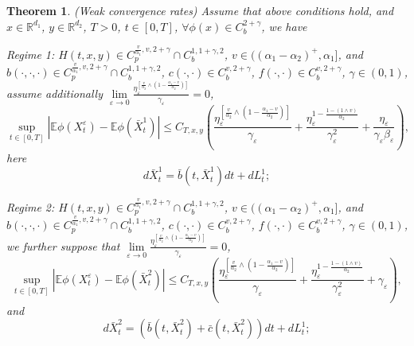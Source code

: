 \documentclass[11pt,reqno]{amsart}
\newtheorem{theorem}{\indent Theorem}[section]
\numberwithin{equation}{section}
\begin{document}
\begin{theorem}\label{WCRD}(Weak convergence rates)
	Assume that above conditions hold, and   $x\in \mathbb{R}^{d_{1}}$, $y\in \mathbb{R}^{d_{2}}$,   $T>0$, $t\in[0,T]$,   $\forall \phi(x)\in C^{2+\gamma}_{b}$, 
	we have
	
	Regime 1:  $H(t,x,y)\in C_{p}^{\frac{v}{\alpha_{1}},v,2+\gamma}\cap C_{b}^{1,1+\gamma,2}$, $v\in((\alpha_{1}-\alpha_{2})^{+},\alpha_{1}]$, and  $b(\cdot,\cdot,\cdot)\in C_{p}^{\frac{v}{\alpha_{1}},v,2+\gamma}\cap C_{b}^{1,1+\gamma,2}$, $c(\cdot,\cdot)\in C_{b}^{v,2+\gamma}$, $f(\cdot,\cdot)\in C_{b}^{v,2+\gamma}$,   $\gamma\in (0,1)$,  assume additionally $ \lim\limits_{\varepsilon \rightarrow0}\frac{ \eta_{\varepsilon}^{\left[ \frac{v}{\alpha_{2}}\wedge \left( 1-\frac{\alpha_{1}-v}{\alpha_{2}} \right)\right]  }}{\gamma_{\varepsilon}}=0$, 
	\begin{equation}\nonumber
		\sup_{t\in [0,T]}|\mathbb{E}\phi(X_{t}^{\varepsilon})-\mathbb{E}\phi(\bar{X}^{1}_{t})|\leq C_{T,x,y} \left( \frac{ \eta_{\varepsilon}^{\left[ \frac{v}{\alpha_{2}}\wedge \left( 1-\frac{\alpha_{1}-v}{\alpha_{2}} \right)  \right]  }}{\gamma_{\varepsilon}}+\frac{ \eta_{\varepsilon}^{1-\frac{1-(1\wedge v)}{\alpha_{2}}}}{\gamma^{2}_{\varepsilon}}+\frac{\eta_{\varepsilon}}{\gamma_{\varepsilon}\beta_{\varepsilon}}\right) ,
	\end{equation}
	here
	\begin{equation}\nonumber
		d\bar{X}^{1}_{t}=\bar{b}(t,\bar{X}^{1}_{t})dt+dL_{t}^{1};
	\end{equation}
	
	
	Regime 2: $H(t,x,y)\in C_{p}^{\frac{v}{\alpha_{1}},v,2+\gamma}\cap C_{b}^{1,1+\gamma,2}$, $v\in((\alpha_{1}-\alpha_{2})^{+},\alpha_{1}]$, and  $b(\cdot,\cdot,\cdot)\in C_{p}^{\frac{v}{\alpha_{1}},v,2+\gamma}\cap C_{b}^{1,1+\gamma,2}$, $c(\cdot,\cdot)\in C_{b}^{v,2+\gamma}$, $f(\cdot,\cdot)\in C_{b}^{v,2+\gamma}$,   $\gamma\in (0,1)$,  we  further suppose that  $ \lim\limits_{\varepsilon \rightarrow0}\frac{ \eta_{\varepsilon}^{\left[ \frac{v}{\alpha_{2}}\wedge \left( 1-\frac{\alpha_{1}-v}{\alpha_{2}} \right)  \right]  }}{\gamma_{\varepsilon}}=0$,  
	\begin{equation}\nonumber
		\sup_{t\in [0,T]}|\mathbb{E}\phi(X_{t}^{\varepsilon})-\mathbb{E}\phi(\bar{X}^{2}_{t})|\leq  C_{T,x,y}\left(\frac{ \eta_{\varepsilon}^{\left[ \frac{v}{\alpha_{2}}\wedge \left( 1-\frac{\alpha_{1}-v}{\alpha_{2}} \right)  \right]  }}{\gamma_{\varepsilon}}+\frac{ \eta_{\varepsilon}^{1-\frac{1-(1\wedge v)}{\alpha_{2}}}}{\gamma^{2}_{\varepsilon}}+\gamma_{\varepsilon}\right)  ,
	\end{equation}
	and 
	\begin{equation}\nonumber
		d\bar{X}^{2}_{t}=(\bar{b}(t,\bar{X}^{2}_{t})+\bar{c}(t,\bar{X}^{2}_{t}))dt+dL_{t}^{1};
	\end{equation}
	

\end{theorem}
\end{document}
